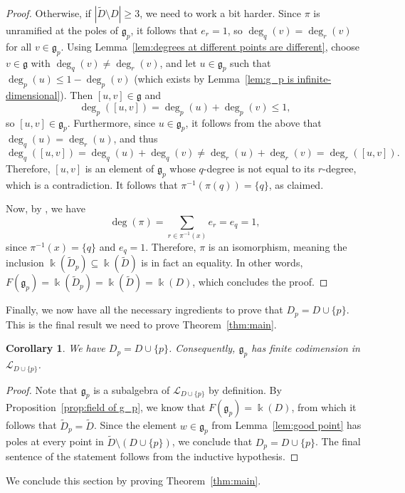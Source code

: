 \documentclass[12pt]{amsart}
\theoremstyle{plain}
\newtheorem{corollary}[theorem]{Corollary}
\theoremstyle{definition}
\numberwithin{equation}{section}
\def\g{\mathfrak{g}}
\def\L{\mathcal{L}}
\def\kk{\Bbbk}
\begin{document}
\begin{proof}
    Otherwise, if $|\widetilde{D} \setminus D| \geq 3$, we need to work a bit harder. Since $\pi$ is unramified at the poles of $\g_p$, it follows that $e_r = 1$, so $\deg_q(v) = \deg_r(v)$ for all $v \in \g_p$. Using Lemma~\ref{lem:degrees at different points are different}, choose $v \in \g$ with $\deg_q(v) \neq \deg_r(v)$, and let $u \in \g_p$ such that $\deg_p(u) \leq 1 - \deg_p(v)$ (which exists by Lemma~\ref{lem:g_p is infinite-dimensional}). Then $[u,v] \in \g$ and
    $$\deg_p([u,v]) = \deg_p(u) + \deg_p(v) \leq 1,$$
    so $[u,v] \in \g_p$. Furthermore, since $u \in \g_p$, it follows from the above that $\deg_q(u) = \deg_r(u)$, and thus
    $$\deg_q([u,v]) = \deg_q(u) + \deg_q(v) \neq \deg_r(u) + \deg_r(v) = \deg_r([u,v]).$$
    Therefore, $[u,v]$ is an element of $\g_p$ whose $q$-degree is not equal to its $r$-degree, which is a contradiction. It follows that $\pi^{-1}(\pi(q)) = \{q\}$, as claimed.

    Now, by \cite[Proposition II.2.6(a)]{Silverman}, we have
    $$\deg(\pi) = \sum_{r \in \pi^{-1}(x)} e_r = e_q = 1,$$
    since $\pi^{-1}(x) = \{q\}$ and $e_q = 1$. Therefore, $\pi$ is an isomorphism, meaning the inclusion $\kk(\widetilde{D}_p) \subseteq \kk(\widetilde{D})$ is in fact an equality. In other words, $F(\g_p) = \kk(\widetilde{D}_p) = \kk(\widetilde{D}) = \kk(D)$, which concludes the proof.
\end{proof}

Finally, we now have all the necessary ingredients to prove that $D_p = D \cup \{p\}$. This is the final result we need to prove Theorem~\ref{thm:main}.

\begin{corollary}\label{cor:g_p has poles everywhere}
    We have $D_p = D \cup \{p\}$. Consequently, $\g_p$ has finite codimension in $\L_{D \cup \{p\}}$.
\end{corollary}
\begin{proof}
     Note that $\g_p$ is a subalgebra of $\L_{D \cup \{p\}}$ by definition. By Proposition~\ref{prop:field of g_p}, we know that $F(\g_p) = \kk(D)$, from which it follows that $\widetilde{D}_p = \widetilde{D}$. Since the element $w \in \g_p$ from Lemma~\ref{lem:good point} has poles at every point in $\widetilde{D} \setminus (D \cup \{p\})$, we conclude that $D_p = D \cup \{p\}$. The final sentence of the statement follows from the inductive hypothesis.
\end{proof}

We conclude this section by proving Theorem~\ref{thm:main}.
\end{document}
